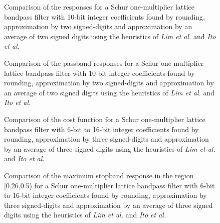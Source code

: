 \documentclass[a4paper,twoside,10pt,english]{report}
\begin{document}
\begin{figure}[!htbp]
\begin{center}
\scalebox{0.7}{}
\caption{Comparison of the responses for a Schur one-multiplier lattice
bandpass filter with 10-bit integer coefficients found by rounding,
approximation by two signed-digits and approximation by an average of two signed
digits using the heuristics of \emph{Lim et al.} and \emph{Ito et al.}}
\label{fig:schurOneMlattice-bandpass-allocsd-2-10-response}
\end{center}
\end{figure}
\begin{figure}[!htbp]
\begin{center}
\scalebox{0.7}{}
\caption{Comparison of the passband responses for a Schur one-multiplier lattice
bandpass filter with 10-bit integer coefficients found by rounding,
approximation by two signed-digits and approximation by an average of two signed
digits using the heuristics of \emph{Lim et al.} and \emph{Ito et al.}}
\label{fig:schurOneMlattice-bandpass-allocsd-2-10-passband-response}
\end{center}
\end{figure}
\begin{figure}[!htbp]
\begin{center}
\scalebox{0.7}{}
\caption{Comparison of the cost function for a Schur one-multiplier lattice
bandpass filter with 6-bit to 16-bit integer coefficients found by rounding,
approximation by three signed-digits and approximation by an average of three
signed digits using the heuristics of \emph{Lim et al.} and \emph{Ito et al.}}
\label{fig:schurOneMlattice-bandpass-3-allocsd-cost}
\end{center}
\end{figure}
\begin{figure}[!htbp]
\begin{center}
\scalebox{0.7}{}
\caption{Comparison of the maximum stopband response in the region [0.26,0.5)
for a Schur one-multiplier lattice
bandpass filter with 6-bit to 16-bit integer coefficients found by rounding,
approximation by three signed-digits and approximation by an average of three
signed digits using the heuristics of \emph{Lim et al.} and \emph{Ito et al.}}
\label{fig:schurOneMlattice-bandpass-3-allocsd-sidelobe}
\end{center}
\end{figure}
\end{document}
